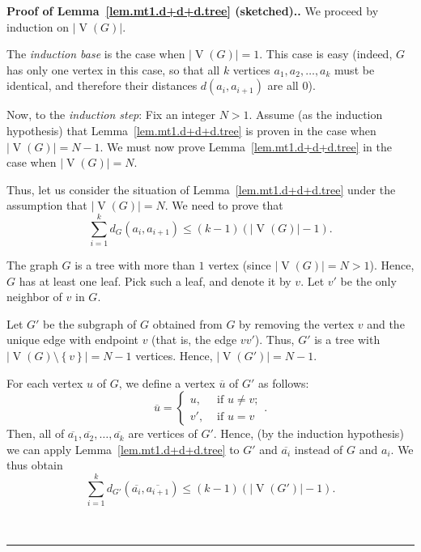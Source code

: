\documentclass[numbers=enddot,12pt,final,onecolumn,notitlepage]{scrartcl}%
\theoremstyle{definition}
\newenvironment{proof}[1][Proof]{\noindent\textbf{#1.} }{\ \rule{0.5em}{0.5em}}
\let\sumnonlimits\sum
\renewcommand{\sum}{\sumnonlimits\limits}
\newcommand{\set}[1]{\left\{ #1 \right\}}
\newcommand{\abs}[1]{\left| #1 \right|}
\newcommand{\tup}[1]{\left( #1 \right)}
\newcommand{\verts}[1]{\operatorname{V}\left( #1 \right)}
\begin{document}
\begin{proof}[Proof of Lemma~\ref{lem.mt1.d+d+d.tree} (sketched).]
We proceed by induction on $\abs{\verts{G}}$.

The \textit{induction base} is the case when $\abs{\verts{G}} = 1$.
This case is easy (indeed, $G$ has only one vertex in this case, so
that all $k$ vertices $a_1, a_2, \ldots, a_k$ must be identical,
and therefore their distances $d \tup{a_i, a_{i+1}}$ are all $0$).

Now, to the \textit{induction step}: Fix an integer $N > 1$.
Assume (as the induction hypothesis)
that Lemma~\ref{lem.mt1.d+d+d.tree} is proven in the case when
$\abs{\verts{G}} = N-1$.
We must now prove Lemma~\ref{lem.mt1.d+d+d.tree} in the case when
$\abs{\verts{G}} = N$.

Thus, let us consider the situation of
Lemma~\ref{lem.mt1.d+d+d.tree} under the assumption that
$\abs{\verts{G}} = N$.
We need to prove that
\begin{equation}
\sum_{i=1}^k d_G \tup{a_i, a_{i+1}}
\leq \tup{k-1} \tup{\abs{\verts{G}}-1} .
\label{pf.lem.mt1.d+d+d.tree.goal}
\end{equation}

The graph $G$ is a tree with more than $1$ vertex (since
$\abs{\verts{G}} = N > 1$).
Hence, $G$ has at least one leaf.
Pick such a leaf, and denote it by $v$.
Let $v'$ be the only neighbor of $v$ in $G$.

Let $G'$ be the subgraph of $G$ obtained from $G$ by removing the
vertex $v$ and the unique edge with endpoint $v$ (that is, the edge
$vv'$).
Thus, $G'$ is a tree with $\abs{\verts{G} \setminus \set{v}} = N - 1$
vertices. Hence, $\abs{\verts{G'}} = N - 1$.

For each vertex $u$ of $G$, we define a vertex $\overline{u}$ of $G'$
as follows:
\[
\overline{u}
= \begin{cases}
    u   , & \text{ if } u \neq v; \\
    v'  , & \text{ if } u = v
  \end{cases}
.
\]
Then, all of $\overline{a_1}, \overline{a_2}, \ldots, \overline{a_k}$
are vertices of $G'$. Hence, (by the induction hypothesis) we can
apply Lemma~\ref{lem.mt1.d+d+d.tree} to $G'$ and $\overline{a_i}$
instead of $G$ and $a_i$. We thus obtain
\begin{equation}
\sum_{i=1}^k d_{G'} \tup{\overline{a_i}, \overline{a_{i+1}}}
\leq \tup{k-1} \tup{\abs{\verts{G'}}-1} .
\label{pf.lem.mt1.d+d+d.tree.4}
\end{equation}


\end{proof}
\end{document}
